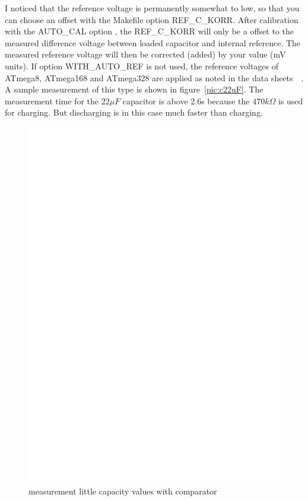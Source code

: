 I noticed that the reference voltage is permanently somewhat to low,
 so that you can choose an offset with the Makefile option REF\_C\_KORR.
After calibration with the AUTO\_CAL option , the REF\_C\_KORR will only be a offset to the measured difference voltage
between loaded capacitor and internal reference.
The measured reference voltage will then be corrected (added) by your value (mV units).
If option WITH\_AUTO\_REF is not used, the reference voltages of ATmega8, ATmega168 and ATmega328
are applied as noted in the data sheets~\cite{ATmega8}~\cite{ATmega168}. 
A sample measurement of this type is shown in figure~\ref{pic:c22uF}.
The measurement time for the \(22 \mu F\) capacitor is above 2.6s because the \(470k\Omega\) is
used for charging. But discharging is in this case much faster than charging.

\begin{figure}[H]
\centering
\includegraphics[]{../FIG/Comparat.eps}
\caption{measurement little capacity values with comparator}
\label{fig:comparat}
\end{figure}

